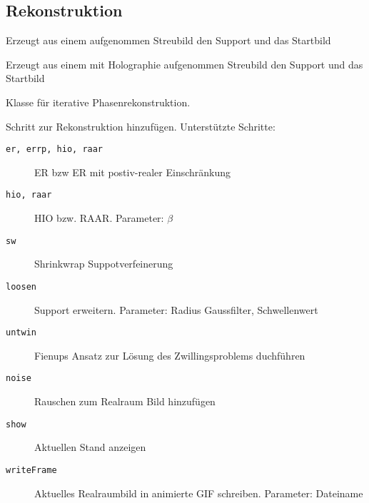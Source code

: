 \subsection*{Rekonstruktion}

	
\begin{description}[style=nextline]
	
	\item [\texttt{\textit{[]}=SupportGeneric\textit{()}}]
		Erzeugt aus einem aufgenommen Streubild den Support und das Startbild
	
	\item [\texttt{\textit{[]}=SupportHolo\textit{()}}]
		Erzeugt aus einem mit Holographie aufgenommen Streubild den Support und das Startbild
	
	\item [\texttt{recon.Plan}] Klasse für iterative Phasenrekonstruktion. 
	\begin{description}[style=nextline]
		\item [\texttt{addStep\textit{(step,iterations,\{parameters\})}}]
		Schritt zur Rekonstruktion hinzufügen. Unterstützte Schritte:
		\begin{description}
			\item[\texttt{er, errp, hio, raar}] ER bzw ER mit postiv-realer Einschränkung
			\item[\texttt{hio, raar}] HIO bzw. RAAR. Parameter: $\beta$
			\item[\texttt{sw}] Shrinkwrap Suppotverfeinerung
			\item[\texttt{loosen}] Support erweitern. Parameter: Radius Gaussfilter, Schwellenwert
			\item[\texttt{untwin}] Fienups Ansatz zur Lösung des Zwillingsproblems duchführen
			\item[\texttt{noise}] Rauschen zum Realraum Bild hinzufügen
			\item[\texttt{show}] Aktuellen Stand anzeigen
			\item[\texttt{writeFrame}] Aktuelles Realraumbild in animierte GIF schreiben. Parameter: Dateiname
		\end{description}	
	\end{description}
\end{description}

\begin{comment}


Hilfmittel
	ft2
	ift2
	maskfilter
	pad2size
Simulation
	Erzeugun von Objekten
		
	-msft
	-multislice
	-thibault

Rekonstruktion
	-wiener
	-reconstruct
	SW
	holo\_support
	ERiter
	RAARiter
	HIOiter
	\end{comment}